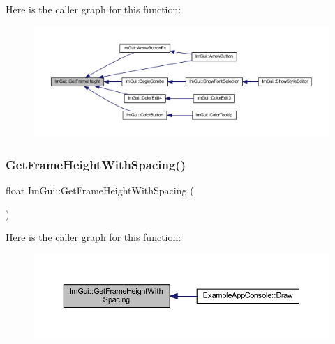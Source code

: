 Here is the caller graph for this function\+:
\nopagebreak
\begin{figure}[H]
\begin{center}
\leavevmode
\includegraphics[width=350pt]{namespace_im_gui_ae560f17cf3262017cee888d1eb77f294_icgraph}
\end{center}
\end{figure}
\mbox{\label{namespace_im_gui_a8de260eebd333718fa0c3b6c80258c67}} 
\subsubsection{\texorpdfstring{Get\+Frame\+Height\+With\+Spacing()}{GetFrameHeightWithSpacing()}}
{\footnotesize\ttfamily float Im\+Gui\+::\+Get\+Frame\+Height\+With\+Spacing (\begin{DoxyParamCaption}{ }\end{DoxyParamCaption})}

Here is the caller graph for this function\+:
\nopagebreak
\begin{figure}[H]
\begin{center}
\leavevmode
\includegraphics[width=350pt]{namespace_im_gui_a8de260eebd333718fa0c3b6c80258c67_icgraph}
\end{center}
\end{figure}
\mbox{\label{namespace_im_gui_a780ad366ee59b123675d598136011970}} 
